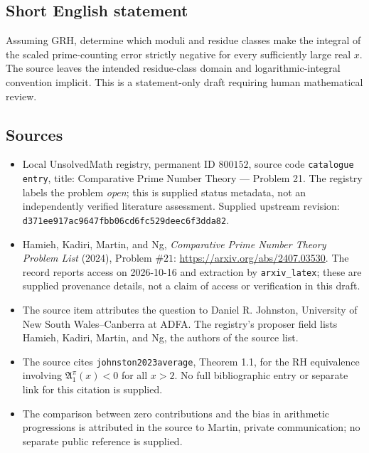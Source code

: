 \documentclass[11pt]{article}
\begin{document}
\subsection{Short English statement}
Assuming GRH, determine which moduli and residue classes make the integral of the scaled prime-counting error strictly negative for every sufficiently large real \(x\). The source leaves the intended residue-class domain and logarithmic-integral convention implicit. This is a statement-only draft requiring human mathematical review.
\subsection{Sources}
\begin{itemize}
\item Local UnsolvedMath registry, permanent ID \(800152\), source code \texttt{catalogue entry}, title: Comparative Prime Number Theory --- Problem 21. The registry labels the problem \emph{open}; this is supplied status metadata, not an independently verified literature assessment. Supplied upstream revision: \texttt{d371ee917ac9647fbb06cd6fc529deec6f3dda82}.
\item Hamieh, Kadiri, Martin, and Ng, \emph{Comparative Prime Number Theory Problem List} (2024), Problem \(\#21\): \url{https://arxiv.org/abs/2407.03530}. The record reports access on 2026-10-16 and extraction by \texttt{arxiv\_latex}; these are supplied provenance details, not a claim of access or verification in this draft.
\item The source item attributes the question to Daniel R. Johnston, University of New South Wales--Canberra at ADFA. The registry's proposer field lists Hamieh, Kadiri, Martin, and Ng, the authors of the source list.
\item The source cites \texttt{johnston2023average}, Theorem 1.1, for the RH equivalence involving \(\mathfrak A_1^\pi(x)<0\) for all \(x>2\). No full bibliographic entry or separate link for this citation is supplied.
\item The comparison between zero contributions and the bias in arithmetic progressions is attributed in the source to Martin, private communication; no separate public reference is supplied.
\end{itemize}
\end{document}
